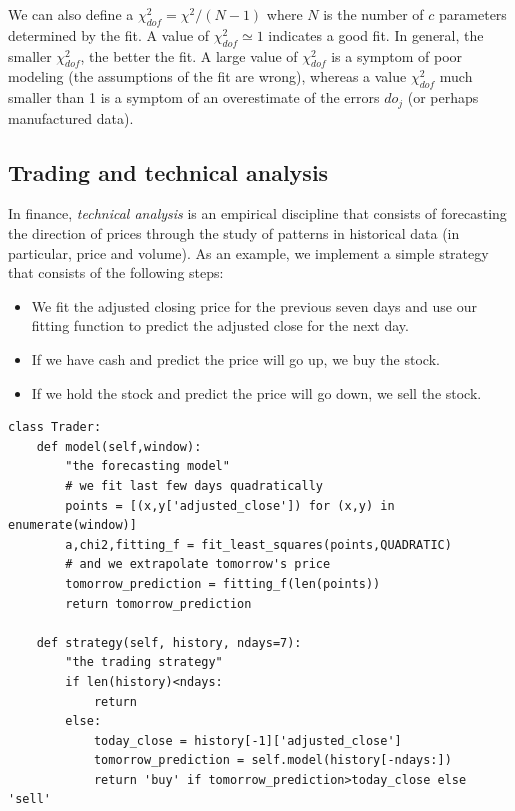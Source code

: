 \documentclass[justified,sixbynine]{tufte-book}
\def\ft{\small\tt}
\theoremstyle{plain}%
\theoremstyle{definition}
\theoremstyle{remark}
\begin{document}
\begin{fullwidth}
We can also define a $\chi^2_{dof} = \chi^2/(N-1)$ where $N$ is the number of $c$ parameters determined by the fit. A value of $\chi^2_{dof} \simeq 1$ indicates a good fit. In general, the smaller $\chi^2_{dof}$, the better the fit. A large value of $\chi^2_{dof}$ is a symptom of poor modeling (the assumptions of the fit are wrong), whereas a value $\chi^2_{dof}$ much smaller than 1 is a symptom of an overestimate of the errors $do_j$ (or perhaps manufactured data).

\goodbreak\subsection{Trading and technical analysis}


In finance, {\it technical analysis} is an empirical discipline that consists of forecasting the direction of prices through the study of patterns in historical data (in particular, price and volume). As an example, we implement a simple strategy that consists of the following steps:

\begin{itemize}
\item We fit the adjusted closing price for the previous seven days and use our fitting function to predict the adjusted close for the next day.
\item If we have cash and predict the price will go up, we buy the stock.
\item If we hold the stock and predict the price will go down, we sell the stock.
\end{itemize}


\begin{lstlisting}[caption={in file: {\ft nlib.py}}]
class Trader:
    def model(self,window):
        "the forecasting model"
        # we fit last few days quadratically
        points = [(x,y['adjusted_close']) for (x,y) in enumerate(window)]
        a,chi2,fitting_f = fit_least_squares(points,QUADRATIC)
        # and we extrapolate tomorrow's price
        tomorrow_prediction = fitting_f(len(points))
        return tomorrow_prediction

    def strategy(self, history, ndays=7):
        "the trading strategy"
        if len(history)<ndays:
            return
        else:
            today_close = history[-1]['adjusted_close']
            tomorrow_prediction = self.model(history[-ndays:])
            return 'buy' if tomorrow_prediction>today_close else 'sell'


\end{lstlisting}
\end{fullwidth}
\end{document}
